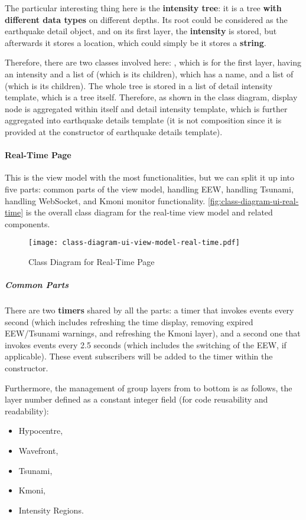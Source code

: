 The particular interesting thing here is the \textbf{intensity tree}: it is a tree \textbf{with different data types} on different depths. Its root could be considered as the earthquake detail object, and on its first layer, the \textbf{intensity} is stored, but afterwards it stores a location, which could simply be it stores a \textbf{string}.

Therefore, there are two classes involved here: , which is for the first layer, having an intensity and a list of  (which is its children), which has a name, and a list of  (which is its children). The whole tree is stored in a list of detail intensity template, which is a tree itself. Therefore, as shown in the class diagram, display node is aggregated within itself and detail intensity template, which is further aggregated into earthquake details template (it is not composition since it is provided at the constructor of earthquake details template).

\paragraph{Real-Time Page}

This is the view model with the most functionalities, but we can split it up into five parts: common parts of the view model, handling EEW, handling Tsunami, handling WebSocket, and Kmoni monitor functionality. \autoref{fig:class-diagram-ui-real-time} is the overall class diagram for the real-time view model and related components.

\begin{figure}[htp]
    \centering
    \texttt{[image: class-diagram-ui-view-model-real-time.pdf]}
    \caption{Class Diagram for Real-Time Page}
    \label{fig:class-diagram-ui-real-time}
\end{figure}

\subparagraph{Common Parts}

There are two \textbf{timers} shared by all the parts: a timer that invokes events every second (which includes refreshing the time display, removing expired EEW/Tsunami warnings, and refreshing the Kmoni layer), and a second one that invokes events every 2.5 seconds (which includes the switching of the EEW, if applicable). These event subscribers will be added to the timer within the constructor.

Furthermore, the management of group layers from to bottom is as follows, the layer number defined as a constant integer field (for code reusability and readability):
\begin{itemize}
    \item Hypocentre,
    \item Wavefront,
    \item Tsunami,
    \item Kmoni,
    \item Intensity Regions.
\end{itemize}

